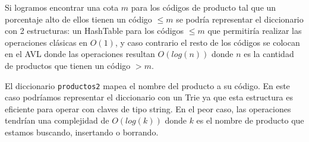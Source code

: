 Si logramos encontrar una cota $m$ para los códigos de producto tal que un porcentaje alto de ellos tienen un código $\leq m$ se podría representar el diccionario con 2 estructuras: un HashTable para los códigos $\leq m$ que permitiría realizar las operaciones clásicas en $O(1)$, y caso contrario el resto de los códigos se colocan en el AVL donde las operaciones resultan $O(log(n))$ donde $n$ es la cantidad de productos que tienen un código $> m$.

El diccionario \lstinline{productos2} mapea el nombre del producto a su código. En este caso podríamos representar el diccionario con un Trie ya que esta estructura es eficiente para operar con claves de tipo string. En el peor caso, las operaciones tendrían una complejidad de $O(log(k))$ donde $k$ es el nombre de producto que estamos buscando, insertando o borrando.
